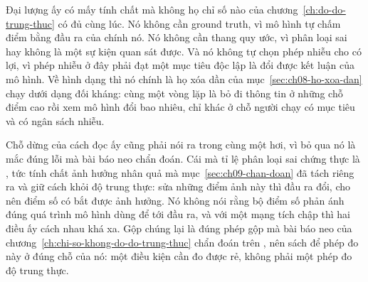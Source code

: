Đại lượng ấy có mấy tính chất mà không họ chỉ số nào của
chương~\ref{ch:do-do-trung-thuc} có đủ cùng lúc. Nó không cần ground truth, vì
mô hình tự chấm điểm bằng đầu ra của chính nó. Nó không cần thang quy ước, vì
phân loại sai hay không là một sự kiện quan sát được. Và nó không tự chọn phép
nhiễu cho có lợi, vì phép nhiễu ở đây phải đạt một mục tiêu độc lập là đổi được
kết luận của mô hình. Về hình dạng thì nó chính là họ xóa dần của
mục~\ref{sec:ch08-ho-xoa-dan} chạy dưới dạng đối kháng: cùng một vòng lặp là bỏ
đi thông tin ở những chỗ điểm cao rồi xem mô hình đổi bao nhiêu, chỉ khác ở chỗ
người chạy có mục tiêu và có ngân sách nhiễu.

%
Chỗ dừng của cách đọc ấy cũng phải nói ra trong cùng một hơi, vì bỏ qua nó là
mắc đúng lỗi mà bài báo neo chẩn đoán. Cái mà tỉ lệ phân loại sai chứng thực là
, tức tính chất ảnh hưởng nhân quả mà
mục~\ref{sec:ch09-chan-doan} đã tách riêng ra và giữ cách khỏi độ trung thực:
sửa những điểm ảnh này thì đầu ra đổi, cho nên điểm số có bắt được ảnh hưởng.
Nó không nói rằng bộ điểm số phản ánh đúng quá trình mô hình dùng để tới đầu
ra, và với một mạng tích chập thì hai điều ấy cách nhau khá xa. Gộp chúng lại
là đúng phép gộp mà bài báo neo của
chương~\ref{ch:chi-so-khong-do-do-trung-thuc} chẩn đoán trên , nên sách để phép đo này ở đúng chỗ của nó: một điều
kiện cần đo được rẻ, không phải một phép đo độ trung thực.

%
